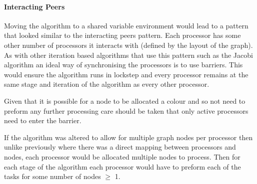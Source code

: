 \documentclass[11pt,a4paper]{article}
\begin{document}
%

\paragraph{Interacting Peers} Moving the algorithm to a shared variable environment would lead to a pattern that looked similar to the interacting peers pattern.  Each processor has some other number of processors it interacts with (defined by the layout of the graph). As with other iteration based algorithms that use this pattern such as the Jacobi algorithm an ideal way of synchronising the processors is to use barriers. This would  ensure the algorithm runs in lockstep and every processor remains at the same stage and iteration of the algorithm as every other processor. 

Given that it is possible for a node to be allocated a colour and so not need to preform any further processing care should be taken that only active processors need to enter the barrier.

If the algorithm was altered to allow for multiple graph nodes per processor then unlike previously where there was a direct mapping between processors and nodes, each processor would be allocated multiple nodes to process. Then for each stage of the algorithm each processor would have to preform each of the tasks for some number of nodes $\geq$ 1.
\end{document}
